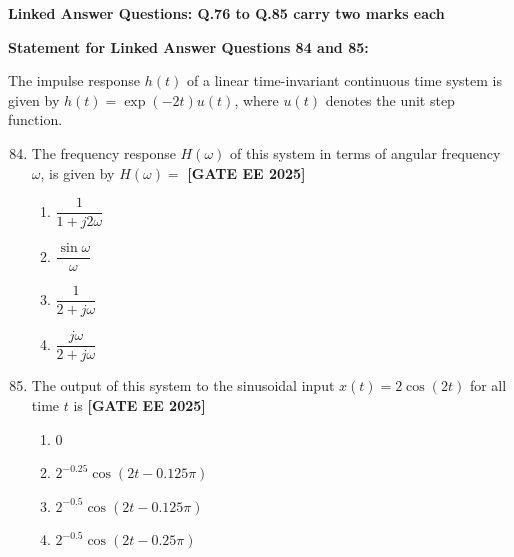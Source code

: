 \documentclass[12pt,a4paper]{article}
\begin{document}
\vspace{1em}
\item \textbf{Linked Answer Questions: Q.76 to Q.85 carry two marks each}
\item \textbf{Statement for Linked Answer Questions 84 and 85: }
\vspace{1em}
\newline
\item The impulse response $h(t)$ of a linear time-invariant continuous time system is given by
$h(t) = \exp(-2 t) u(t)$, where $u(t)$ denotes the unit step function.

\begin{enumerate}[leftmargin=*, label=\textbf{Q.\arabic*:}]
\setcounter{enumi}{83}

\item The frequency response $H(\omega)$ of this system in terms of angular frequency $\omega$, is given by $H(\omega) = $
\newline
\noindent \textbf{[GATE EE 2025]}
\begin{enumerate}[label=(\Alph*)]
  \item $\dfrac{1}{1 + j2\omega}$
  \item $\dfrac{\sin \omega}{\omega}$
  \item $\dfrac{1}{2 + j\omega}$
  \item $\dfrac{j\omega}{2 + j\omega}$
\end{enumerate}

\item The output of this system to the sinusoidal input $x(t) = 2 \cos (2t)$ for all time $t$ is
\newline
\noindent \textbf{[GATE EE 2025]}
\begin{enumerate}[label=(\Alph*)]
  \item $0$
  \item $2^{-0.25} \cos (2t - 0.125\pi)$
  \item $2^{-0.5} \cos (2t - 0.125\pi)$
  \item $2^{-0.5} \cos (2t - 0.25\pi)$
\end{enumerate}


\end{enumerate}
\end{document}

